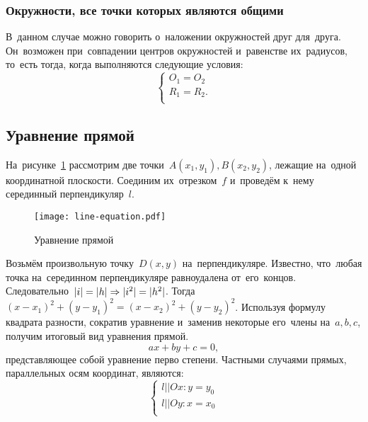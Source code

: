 \documentclass[]{scrartcl}
\begin{document}
\subsubsection{Окружности, все точки которых являются общими}
В~данном случае можно говорить о~наложении окружностей друг для~друга. Он~возможен при~совпадении центров окружностей и~равенстве их~радиусов, то~есть тогда, когда выполняются следующие условия:
\begin{equation}\label{eq:two-circles-intersect-all-points}
\begin{cases}
O_{1}=O_{2}\\
R_{1}=R_{2}.\\
\end{cases}
\end{equation}

\subsection{Уравнение прямой}
На~рисунке~\ref{fig:line-equation} рассмотрим две точки~${\textstyle A(x_{1},y_{1}),B(x_{2},y_{2})}$, лежащие на~одной координатной плоскости. Соединим их~отрезком~${\textstyle f}$ и~проведём к~нему серединный перпендикуляр~${\textstyle l}$.
\begin{figure}[ht]
	\centering %
	\texttt{[image: line-equation.pdf]}
	\caption{Уравнение прямой}\label{fig:line-equation}
\end{figure}
Возьмём произвольную точку~${\textstyle D(x,y)}$ на~перпендикуляре. Известно, что~любая точка на~серединном перпендикуляре равноудалена от~его~концов. Следовательно~${\textstyle \arrowvert i \arrowvert=\arrowvert h \arrowvert \Rightarrow \arrowvert i^2 \arrowvert=\arrowvert h^2 \arrowvert}$. Тогда~${\textstyle (x-x_{1})^2+(y-y_1)^2=(x-x_{2})^2+(y-y_2)^2}$. Используя формулу квадрата разности, сократив уравнение и~заменив некоторые его~члены на~${\textstyle a,b,c}$, получим итоговый вид уравнения прямой.
\begin{equation}\label{eq:line-equation}
ax+by+c=0,
\end{equation}
представляющее собой уравнение перво степени. Частными случаями прямых, параллельных осям координат, являются:
\begin{equation}\label{eq:parallel-line-equations}
\begin{cases}
l||Ox:y=y_0\\
l||Oy:x=x_0\\
\end{cases}
\end{equation}
\end{document}
